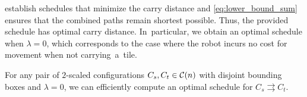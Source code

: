  establish schedules that minimize the carry distance and \cref{eq:lower_bound_sum} ensures that the combined paths remain shortest possible.
Thus, the provided schedule has optimal carry distance.
In~particular, we obtain an optimal schedule when $\lambda = 0$, which corresponds to the case where the robot incurs no cost for movement when not carrying~a~tile.

\begin{corollary}
    For any pair of $2$-scaled configurations $C_s,C_t\in \mathcal{C}(n)$ with disjoint bounding boxes and $\lambda=0$, we can efficiently compute an optimal schedule for ${C_s\rightrightarrows C_t}$.
\end{corollary}
